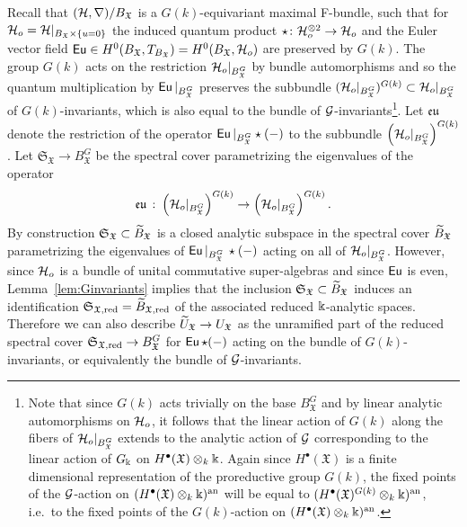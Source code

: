 \documentclass[twoside,leqno]{article}
\numberwithin{equation}{section}
\theoremstyle{plain}
\theoremstyle{definition}
\begin{document}
Recall that $(\mathcal H,\nabla)/B_{\mathfrak{X}}$ is a $G(k)$-equivariant maximal F-bundle, such that for $\mathcal H_{o} = \mathcal H|_{B_{\mathfrak{X}}\times \{u=0\}}$ the induced quantum product $\star \colon \mathcal H_{o}^{\otimes 2} \to \mathcal H_{o}$ and the Euler vector field $\operatorname{\mathsf{Eu}} \in H^0(B_{\mathfrak{X}},T_{B_{\mathfrak{X}}}) = H^0(B_{\mathfrak{X}},\mathcal H_{o})$ are preserved by $G(k)$. The group $G(k)$ acts on 
the restriction $\mathcal H_{o}|_{B^G_{\mathfrak{X}}}$ by bundle automorphisms and so the quantum multiplication by $\operatorname{\mathsf{Eu}}|_{B^G_{\mathfrak{X}}}$ preserves the subbundle $(\mathcal H_{o}|_{B^G_{\mathfrak{X}}})^{G(k)} \subset \mathcal H_{o}|_{B^G_{\mathfrak{X}}} $ of $G(k)$-invariants, which is also equal to the bundle of $\mathcal{G}$-invariants\footnote{Note that since $G(k)$ acts trivially on the base $B_{\mathfrak{X}}^{G}$ and by linear analytic automorphisms on $\mathcal H_{o}$, it follows that the linear action of $G(k)$ along the fibers of $\mathcal H_{o}|_{B^G_{\mathfrak{X}}}$ extends to the analytic action of $\mathcal{G}$ corresponding to the linear action of $G_{\Bbbk}$ on $H^{\bullet}(\mathfrak{X})\otimes_{k} \Bbbk$. Again since $H^{\bullet}(\mathfrak{X})$ is a finite dimensional representation of the proreductive group  $G(k)$, the fixed points of the $\mathcal{G}$-action on $(H^{\bullet}(\mathfrak{X})\otimes_{k} \Bbbk)^{\operatorname{an}}$ will be equal to 
$(H^{\bullet}(\mathfrak{X})^{G(k)}\otimes_{k} \Bbbk)^{\operatorname{an}}$, i.e.\ to the fixed points of the $G(k)$-action on 
$(H^{\bullet}(\mathfrak{X})\otimes_{k} \Bbbk)^{\operatorname{an}}$.}. Let $\mathfrak{eu}$ denote  the restriction of the 
operator $\operatorname{\mathsf{Eu}}|_{B^G_{\mathfrak{X}}}\star (-)$ to the subbundle $\left(\mathcal H_{o}|_{B^G_{\mathfrak{X}}}\right)^{G(k)}$.
Let  $\mathfrak{S}_{\mathfrak{X}} \to B^G_{\mathfrak{{X}}}$ be the spectral cover parametrizing the eigenvalues of the operator 
\[
\mathfrak{eu} \  \colon \left(\mathcal H_{o}|_{B^G_{\mathfrak{X}}}\right)^{G(k)} \to \left(\mathcal H_{o}|_{B^G_{\mathfrak{X}}}\right)^{G(k)}.
\]
By construction $\mathfrak{S}_{\mathfrak{X}} \subset \widetilde{B}_{\mathfrak{X}}$ is a closed analytic subspace in the spectral cover $\widetilde{B}_{\mathfrak{X}}$ parametrizing the eigenvalues of 
$\operatorname{\mathsf{Eu}}|_{B^G_{\mathfrak{X}}} \, \star (-)$ acting on all of 
$\mathcal H_{o}|_{B^G_{\mathfrak{X}}}$. However, since $\mathcal H_{o}$ is a bundle of unital commutative super-algebras and since $\operatorname{\mathsf{Eu}}$ is even, Lemma~\ref{lem:Ginvariants} implies that the inclusion $\mathfrak{S}_{\mathfrak{X}} \subset \widetilde{B}_{\mathfrak{X}}$ induces an identification
$\mathfrak{S}_{\mathfrak{X},\operatorname{red}}  = \widetilde{B}_{\mathfrak{X},\operatorname{red}}$ of the associated reduced $\Bbbk$-analytic spaces. 
Therefore we can also describe  $\widetilde U_{\mathfrak{X}} \to U_{\mathfrak{X}}$ as the unramified part of the reduced spectral cover $\mathfrak{S}_{\mathfrak{X},\operatorname{red}} \to B^G_{\mathfrak{X}}$ for $\operatorname{\mathsf{Eu}}\star (-)$ acting on the bundle of $G(k)$-invariants, or equivalently the bundle of $\mathcal{G}$-invariants.
\end{document}
